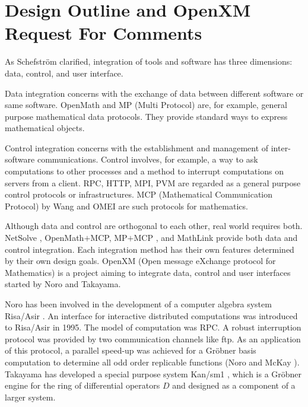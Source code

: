 
\section{Design Outline and OpenXM Request For Comments} 

As Schefstr\"om\cite{schefstrom} clarified,
integration of tools and software has three dimensions:
data, control, and user interface.

Data integration concerns with the exchange of data between different
software or same software.
OpenMath \cite{OpenMath} and MP (Multi Protocol) \cite{GKW} are,
for example, general purpose mathematical data protocols.
They provide standard ways to express mathematical objects.

Control integration concerns with the establishment and management of
inter-software communications.
Control involves, for example, a way to ask computations to other processes
and a method to interrupt computations on servers from a client.
RPC, HTTP, MPI, PVM are regarded as a general purpose control protocols or
infrastructures.
MCP (Mathematical Communication Protocol)
by Wang \cite{iamc} and OMEI \cite{omei} are such protocols for mathematics.

Although data and control are orthogonal to each other,
real world requires both.
NetSolve \cite{netsolve}, OpenMath$+$MCP, MP$+$MCP \cite{iamc},
and MathLink \cite{mathlink} provide both data and control integration.
Each integration method has their own features determined by their
own design goals.
OpenXM (Open message eXchange protocol for Mathematics)
is a project aiming to integrate data, control and user interfaces
started by Noro and Takayama.

Noro has been involved in the development of 
a computer algebra system Risa/Asir \cite{asir}.
An interface for interactive distributed computations was introduced
to Risa/Asir in 1995.
The model of computation was RPC.
A robust interruption protocol was provided 
by  two communication channels like ftp.
As an application of this protocol,
a parallel speed-up was achieved for a Gr\"obner basis computation
to determine all odd order replicable functions 
(Noro and McKay \cite{noro-mckay}).
Takayama has developed
a special purpose system Kan/sm1 \cite{kan},
which is a Gr\"obner engine for the ring of differential operators $D$
and designed as a component of a larger system. 

